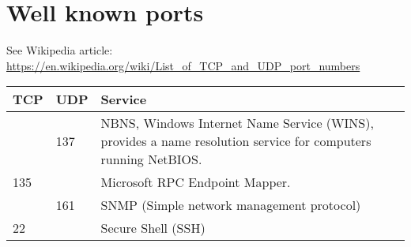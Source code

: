\section{Well known ports}
See Wikipedia article: \url{https://en.wikipedia.org/wiki/List_of_TCP_and_UDP_port_numbers}

\begin{tabular}{|l|l|l|}
    \textbf{TCP} & \textbf{UDP} & \textbf{Service}\\
    \hline
    & 137 & NBNS, Windows Internet Name Service (WINS), provides a name resolution service for computers running NetBIOS.\\
    \hline
    135 & & Microsoft RPC Endpoint Mapper.\\
    \hline
    & 161 & SNMP (Simple network management protocol)\\
    \hline
    22 & & Secure Shell (SSH)\\
    \hline

    
\end{tabular}